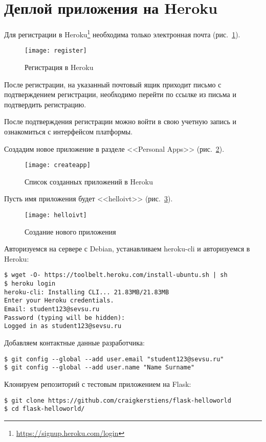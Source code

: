 \section{Деплой приложения на Heroku} \label{pril:e}

Для регистрации в Heroku\footnote{\url{https://signup.heroku.com/login}} необходима только электронная почта (рис.~\ref{pic:heroku_reg}).
\begin{figure}[ht]
    \centering
	\texttt{[image: register]}
    \caption{Регистрация в Heroku}\label{pic:heroku_reg}
\end{figure}

После регистрации, на указанный почтовый ящик приходит письмо с подтверждением регистрации, необходимо перейти по ссылке из письма и подтвердить регистрацию.

После подтверждения регистрации можно войти в свою учетную запись и ознакомиться с интерфейсом платформы.

Создадим новое приложение в разделе <<Personal Apps>> (рис.~\ref{pic:add_app}).
\begin{figure}[ht]
    \centering
	\texttt{[image: createapp]}
    \caption{Список созданных приложений в Heroku}\label{pic:add_app}
\end{figure}

Пусть имя приложения будет <<helloivt>> (рис.~\ref{pic:helloivt}).
\begin{figure}[ht]
    \centering
	\texttt{[image: helloivt]}
    \caption{Создание нового приложения}\label{pic:helloivt}
\end{figure}

Авторизуемся на сервере с Debian, устанавливаем heroku-cli и авторизуемся в Heroku:
\begin{lstlisting}
$ wget -O- https://toolbelt.heroku.com/install-ubuntu.sh | sh
$ heroku login
heroku-cli: Installing CLI... 21.83MB/21.83MB
Enter your Heroku credentials.
Email: student123@sevsu.ru
Password (typing will be hidden):
Logged in as student123@sevsu.ru
\end{lstlisting}

Добавляем контактные данные разработчика:
\begin{lstlisting}
$ git config --global --add user.email "student123@sevsu.ru"
$ git config --global --add user.name "Name Surname"
\end{lstlisting}

Клонируем репозиторий с тестовым приложением на Flask:
\begin{lstlisting}
$ git clone https://github.com/craigkerstiens/flask-helloworld
$ cd flask-helloworld/
\end{lstlisting}

